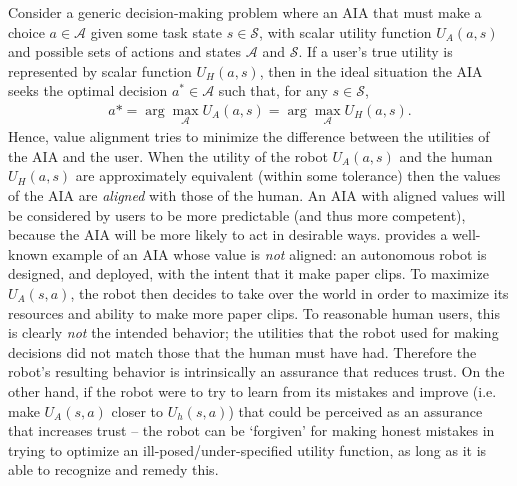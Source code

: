 Consider a generic decision-making problem where an AIA that must make a choice $a \in {\mathcal A}$ given some task state $s \in {\mathcal S}$, with scalar utility function $U_A(a,s)$ and possible sets of actions and states ${\mathcal A}$ and ${\mathcal S}$. If a user's true utility is represented by scalar function $U_H(a,s)$, then in the ideal situation the AIA seeks the optimal decision $a^* \in {\mathcal A}$ such that, for any $s \in {\mathcal S}$,
\begin{align*}
    a* = \arg\max_{\mathcal A} U_A(a,s) = \arg \max_{\mathcal A} U_H(a,s). 
\end{align*}
Hence, value alignment tries to minimize the difference between the utilities of the AIA and the user. When the utility of the robot $U_A(a,s)$ and the human $U_H(a,s)$ are approximately equivalent (within some tolerance) then the values of the AIA are \emph{aligned} with those of the human. An AIA with aligned values will be considered by users to be more predictable (and thus more competent), because the AIA will be more likely to act in desirable ways. 
% 
\citet{Bostrom2014-fz} provides a well-known example of an AIA whose value is \emph{not} aligned: an autonomous robot is designed, and deployed, with the intent that it make paper clips. To maximize $U_A(s,a)$, the robot then decides to take over the world in order to maximize its resources and ability to make more paper clips. To reasonable human users, this is clearly \emph{not} the intended behavior; the utilities that the robot used for making decisions did not match those that the human must have had. Therefore the robot's resulting behavior is intrinsically an assurance that reduces trust. On the other hand, if the robot were to try to learn from its mistakes and improve (i.e. make $U_A(s,a)$ closer to $U_h(s,a)$) that could be perceived as an assurance that increases trust -- the robot can be `forgiven' for making honest mistakes in trying to optimize an ill-posed/under-specified utility function, as long as it is able to recognize and remedy this. 

